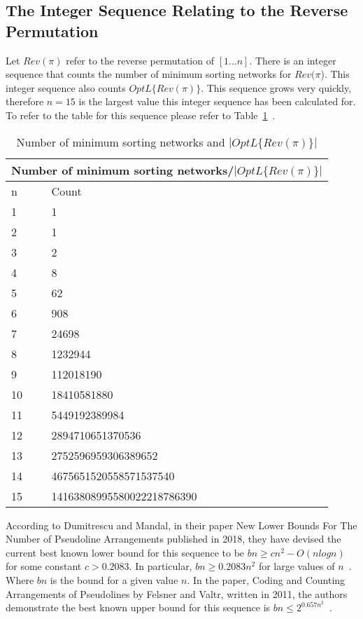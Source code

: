 \subsection{The Integer Sequence Relating to the Reverse Permutation}
Let $Rev(\pi)$ refer to the reverse permutation of $[1 \dots n]$. There is an integer sequence that counts the number of minimum sorting networks 
for $Rev(\pi$). This integer sequence also counts $OptL\{Rev(\pi)\}$. This sequence grows very quickly, therefore $n=15$ 
is  the largest value this integer sequence has been calculated for. To refer to the table for this sequence 
please refer to Table~\ref{Tab:IntSeq1}~\cite{A30}.
\begin{table}[t]
    \begin{center}

    \begin{tabular}{|p{2cm}||p{8cm}|}
        \hline
        \multicolumn{2}{|c|}{Number of minimum sorting networks/$|OptL\{Rev(\pi)\}|$}\\
        \hline
        n & Count \\ 
        \hline 
        1 & 1 \\
        \hline 
        2 & 1 \\
        \hline 
        3 & 2 \\
        \hline 
        4 & 8 \\
        \hline 
        5 & 62 \\
        \hline 
        6 & 908 \\
        \hline 
        7 & 24698 \\
        \hline 
        8 & 1232944 \\
        \hline 
        9 & 112018190 \\
        \hline 
        10 & 18410581880 \\
        \hline 
        11 & 5449192389984 \\ 
        \hline 
        12 & 2894710651370536 \\
        \hline 
        13 & 2752596959306389652 \\
        \hline 
        14 & 4675651520558571537540 \\
        \hline 
        15 & 14163808995580022218786390 \\
        \hline 
    \end{tabular}
    \end{center}
    \caption{Number of minimum sorting networks and $|OptL\{Rev(\pi)\}|$}
    \label{Tab:IntSeq1}
\end{table}\par
According to Dumitrescu and Mandal, in their paper New Lower Bounds For The Number of Pseudoline Arrangements 
published in 2018, they have devised the current best known lower bound for this sequence to be 
$bn \geq cn^{2} - O(n log n)$ for some constant $c > 0.2083$. In particular, $bn \geq 0.2083 n^{2}$
for large values of $n$~\cite{A33}. Where $bn$ is the bound for a given value $n$. In the paper, Coding 
and Counting Arrangements of Pseudolines by Felsner and Valtr, written in 2011, the authors demonstrate 
the best known upper bound for this sequence is $bn \leq 2^{0.657n^{2}}$~\cite{A32}.\par 

